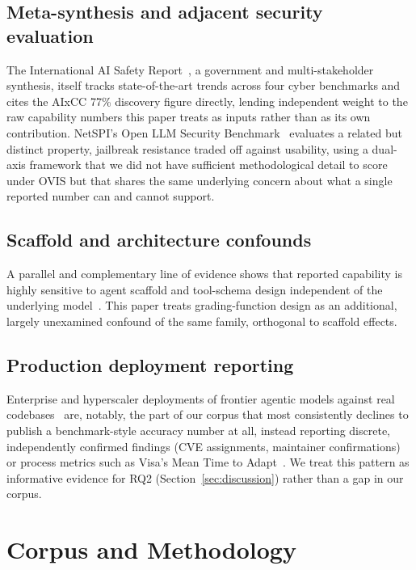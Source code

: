 \documentclass[10pt,twocolumn]{article}
\begin{document}
\subsection{Meta-synthesis and adjacent security evaluation}
The International AI Safety Report~\cite{aisr2026}, a government and
multi-stakeholder synthesis, itself tracks state-of-the-art trends
across four cyber benchmarks and cites the AIxCC 77\% discovery figure
directly, lending independent weight to the raw capability numbers this
paper treats as inputs rather than as its own contribution. NetSPI's
Open LLM Security Benchmark~\cite{netspi2025} evaluates a related but
distinct property, jailbreak resistance traded off against usability,
using a dual-axis framework that we did not have sufficient
methodological detail to score under OVIS but that shares the same
underlying concern about what a single reported number can and cannot
support.

\subsection{Scaffold and architecture confounds}
A parallel and complementary line of evidence shows that reported
capability is highly sensitive to agent scaffold and tool-schema design
independent of the underlying model~\cite{xbow2026,dcipher2025,enigma2024}.
This paper treats grading-function design as an additional, largely
unexamined confound of the same family, orthogonal to scaffold effects.

\subsection{Production deployment reporting}
Enterprise and hyperscaler deployments of frontier agentic models
against real codebases~\cite{visavvah2026,bigsleep2025,aisle2025} are,
notably, the part of our corpus that most consistently declines to
publish a benchmark-style accuracy number at all, instead reporting
discrete, independently confirmed findings (CVE assignments, maintainer
confirmations) or process metrics such as Visa's Mean Time to
Adapt~\cite{visavvah2026}. We treat this pattern as informative evidence
for RQ2 (Section~\ref{sec:discussion}) rather than a gap in our corpus.

\section{Corpus and Methodology}
\label{sec:method}
\end{document}
